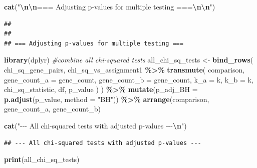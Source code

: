 \documentclass[
]{article}
\newenvironment{Shaded}{\begin{snugshade}}{\end{snugshade}}
\newcommand{\AttributeTok}[1]{\textcolor[rgb]{0.13,0.29,0.53}{#1}}
\newcommand{\CommentTok}[1]{\textcolor[rgb]{0.56,0.35,0.01}{\textit{#1}}}
\newcommand{\FunctionTok}[1]{\textcolor[rgb]{0.13,0.29,0.53}{\textbf{#1}}}
\newcommand{\NormalTok}[1]{#1}
\newcommand{\OtherTok}[1]{\textcolor[rgb]{0.56,0.35,0.01}{#1}}
\newcommand{\SpecialCharTok}[1]{\textcolor[rgb]{0.81,0.36,0.00}{\textbf{#1}}}
\newcommand{\StringTok}[1]{\textcolor[rgb]{0.31,0.60,0.02}{#1}}
\begin{document}
\begin{Shaded}
\begin{Highlighting}[]
\FunctionTok{cat}\NormalTok{(}\StringTok{"}\SpecialCharTok{\textbackslash{}n\textbackslash{}n}\StringTok{=== Adjusting p{-}values for multiple testing ===}\SpecialCharTok{\textbackslash{}n\textbackslash{}n}\StringTok{"}\NormalTok{)}
\end{Highlighting}
\end{Shaded}

\begin{verbatim}
## 
## 
## === Adjusting p-values for multiple testing ===
\end{verbatim}

\begin{Shaded}
\begin{Highlighting}[]
\FunctionTok{library}\NormalTok{(dplyr)}
\CommentTok{\#combine all chi{-}squared tests}
\NormalTok{all\_chi\_sq\_tests }\OtherTok{\textless{}{-}} \FunctionTok{bind\_rows}\NormalTok{(}
\NormalTok{  chi\_sq\_gene\_pairs,}
\NormalTok{  chi\_sq\_vs\_assignment1 }\SpecialCharTok{\%\textgreater{}\%} 
    \FunctionTok{transmute}\NormalTok{(}
\NormalTok{      comparison,}
      \AttributeTok{gene\_count\_a =}\NormalTok{ gene\_count,}
      \AttributeTok{gene\_count\_b =}\NormalTok{ gene\_count,}
      \AttributeTok{k\_a =}\NormalTok{ k,}
      \AttributeTok{k\_b =}\NormalTok{ k,}
\NormalTok{      chi\_sq\_statistic,}
\NormalTok{      df,}
\NormalTok{      p\_value}
\NormalTok{    )}
\NormalTok{) }\SpecialCharTok{\%\textgreater{}\%}
  \FunctionTok{mutate}\NormalTok{(}\AttributeTok{p\_adj\_BH =} \FunctionTok{p.adjust}\NormalTok{(p\_value, }\AttributeTok{method =} \StringTok{"BH"}\NormalTok{)) }\SpecialCharTok{\%\textgreater{}\%}
  \FunctionTok{arrange}\NormalTok{(comparison, gene\_count\_a, gene\_count\_b)}

\FunctionTok{cat}\NormalTok{(}\StringTok{"{-}{-}{-} All chi{-}squared tests with adjusted p{-}values {-}{-}{-}}\SpecialCharTok{\textbackslash{}n}\StringTok{"}\NormalTok{)}
\end{Highlighting}
\end{Shaded}

\begin{verbatim}
## --- All chi-squared tests with adjusted p-values ---
\end{verbatim}

\begin{Shaded}
\begin{Highlighting}[]
\FunctionTok{print}\NormalTok{(all\_chi\_sq\_tests)}
\end{Highlighting}
\end{Shaded}
\end{document}
